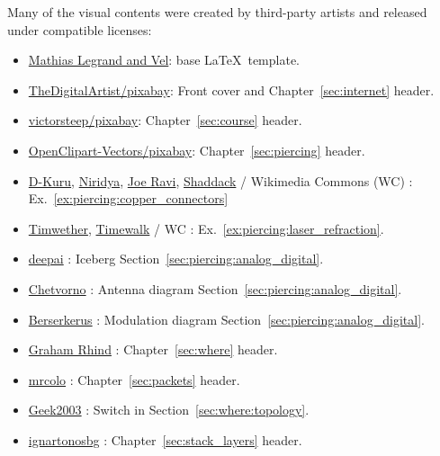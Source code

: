\noindent Many of the visual contents were created by third-party artists and released under compatible licenses:
\begin{itemize}
\item \href{https://www.overleaf.com/latex/templates/the-legrand-orange-book-template-english/jtctyfmnpppc}{Mathias Legrand and Vel}: base \LaTeX\ template.
\item \href{https://pixabay.com/users/thedigitalartist-202249/}{TheDigitalArtist/pixabay}: Front cover and Chapter~\ref{sec:internet} header.
\item \href{https://pixabay.com/users/victorsteep-9526460/}{victorsteep/pixabay}: Chapter~\ref{sec:course} header.
\item \href{https://pixabay.com/users/openclipart-vectors-30363/}{OpenClipart-Vectors/pixabay}: Chapter~\ref{sec:piercing} header.
\item 
\href{https://en.wikipedia.org/wiki/File:HDMI_connector-male_2_sharp_PNr\%C2\%B00059.jpg}{D-Kuru},
\href{https://commons.wikimedia.org/wiki/File:USB_Type-C_icon.svg}{Niridya},
\href{https://commons.wikimedia.org/wiki/File:N_Connector.jpg}{Joe Ravi},
\href{https://en.wikipedia.org/wiki/File:Photo-RJ11-MF.jpg}{Shaddack}
/ Wikimedia Commons (WC) : Ex.~\ref{ex:piercing:copper_connectors}
\item \href{https://en.wikipedia.org/wiki/File:Laser_in_fibre.jpg}{Timwether}, \href{https://commons.wikimedia.org/wiki/File:MMF_optical.jpg}{Timewalk} / WC : Ex.~\ref{ex:piercing:laser_refraction}.
\item \href{https://deepai.org/machine-learning-model/text2img}{deepai} : Iceberg Section~\ref{sec:piercing:analog_digital}.
\item \href{https://commons.wikimedia.org/wiki/File:Dipole_receiving_antenna_animation_6_300ms.gif}{Chetvorno} : Antenna diagram Section~\ref{sec:piercing:analog_digital}.
\item \href{https://commons.wikimedia.org/wiki/File:Amfm3-en-de.gif}{Berserkerus} : Modulation diagram Section~\ref{sec:piercing:analog_digital}.
\item \href{https://www.pinterest.com/pin/118289927683058369/}{Graham Rhind} : Chapter~\ref{sec:where} header.
\item \href{https://pixabay.com/photos/container-goods-ship-port-cargo-4675851/}{mrcolo} : Chapter~\ref{sec:packets} header.
\item \href{https://commons.wikimedia.org/wiki/File:2550T-PWR-Front.jpg}{Geek2003} : Switch in Section~\ref{sec:where:topology}.
\item \href{https://pixabay.com/photos/vegetable-onion-flavor-ingredient-6829271/}{ignartonosbg} : Chapter~\ref{sec:stack_layers} header.

\end{itemize}

